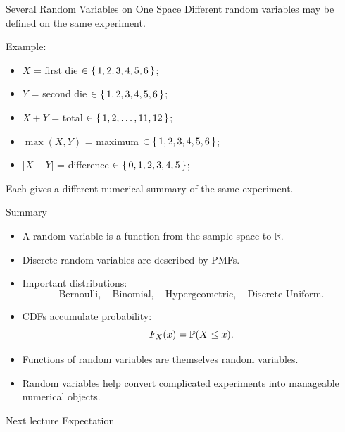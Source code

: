 \begin{frame}{Several Random Variables on One Space}
Different random variables may be defined on the same experiment.

\vspace{0.25cm}

Example:
\begin{itemize}
    \item $X$ = first die $\in \set{1,2,3,4,5,6}$;
    \item $Y$ = second die $\in \set{1,2,3,4,5,6}$;
    \item $X+Y$ = total $\in \set{1,2,\dots, 11,12}$;
    \item $\max(X,Y)$ = maximum $\in \set{1,2,3,4,5,6}$;
    \item $|X-Y|$ = difference $\in \set{0,1,2,3,4,5}$;
\end{itemize}

\vspace{0.25cm}

Each gives a different numerical summary of the same experiment.
\end{frame}

\begin{frame}{Summary}
\begin{itemize}
    \item A random variable is a function from the sample space to $\mathbb{R}$.

    \item Discrete random variables are described by PMFs.

    \item Important distributions:
    \[
    \text{Bernoulli},\quad
    \text{Binomial},\quad
    \text{Hypergeometric},\quad
    \text{Discrete Uniform}.
    \]

    \item CDFs accumulate probability:
    \[
    F_X(x)=\mathbb{P}(X\leq x).
    \]

    \item Functions of random variables are themselves random variables.

    \item Random variables help convert complicated experiments into manageable numerical objects.
\end{itemize}

\vspace{0.25cm}

\begin{keybox}{Next lecture}
Expectation
\end{keybox}
\end{frame}